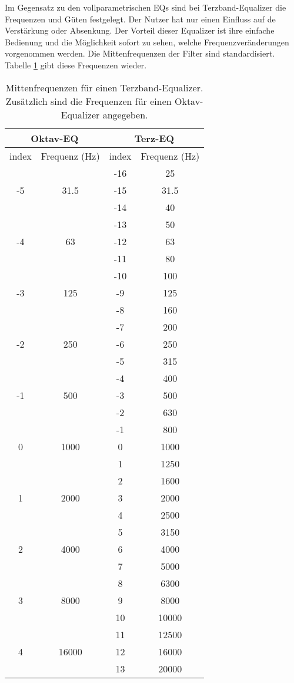 Im Gegensatz zu den vollparametrischen EQs sind bei
Terzband-Equalizer die Frequenzen und Güten festgelegt. Der Nutzer
hat nur einen Einfluss auf de Verstärkung oder Absenkung. Der
Vorteil dieser Equalizer ist ihre einfache Bedienung und die
Möglichkeit sofort zu sehen, welche Frequenzveränderungen
vorgenommen werden. Die Mittenfrequenzen der Filter sind
standardisiert. Tabelle \ref{Tab:MittenfrequenzenTerzband} gibt
diese Frequenzen wieder.
\begin{table}
\begin{tabular}{|c|c|c|c|}
  \hline
  \multicolumn{2}{|c|}{Oktav-EQ}& \multicolumn{2}{|c|}{Terz-EQ}\\
\hline
  index & Frequenz (Hz) & index & Frequenz (Hz) \\
  \hline
     &      & -16 & 25 \\
  -5 & 31.5 & -15 & 31.5 \\
     &      & -14 & 40 \\\hline
     &      & -13 & 50 \\
  -4 & 63   & -12 & 63 \\
     &      & -11 & 80 \\\hline
     &      & -10 & 100 \\
  -3 & 125  & -9  & 125 \\
     &      & -8  & 160 \\\hline
     &      & -7  & 200 \\
  -2 & 250  & -6  & 250 \\
     &      & -5  & 315 \\\hline
     &      & -4  & 400 \\
  -1 & 500  & -3  & 500 \\
     &      & -2  & 630 \\\hline
     &      & -1  & 800 \\
  0  & 1000 & 0   & 1000 \\
     &      & 1   & 1250 \\\hline
     &      & 2   & 1600 \\
  1  & 2000 & 3   & 2000 \\
     &      & 4   & 2500 \\\hline
     &      & 5   & 3150 \\
  2  & 4000 & 6   & 4000 \\
     &      & 7   & 5000 \\\hline
     &      & 8   & 6300 \\
  3  & 8000 & 9   & 8000 \\
     &      & 10  & 10000 \\\hline
     &      & 11  & 12500 \\
  4 & 16000 & 12  & 16000 \\
    &       & 13  & 20000 \\
  \hline
\end{tabular}

\caption{\label{Tab:MittenfrequenzenTerzband}Mittenfrequenzen für
einen Terzband-Equalizer. Zusätzlich sind die Frequenzen für einen
Oktav-Equalizer angegeben.}
\end{table}

